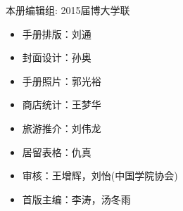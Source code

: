 \begin{titlepage}
\newpage

\topmargin=0cm 

\vspace{3cm}\centerline{\Large 本册编辑组: 2015届博大学联} 

\begin{itemize}
\item[] 手册排版：刘通
\item[] 封面设计：孙奥
\item[] 手册照片：郭光裕
\item[] 商店统计：王梦华
\item[] 旅游推介：刘伟龙
\item[] 居留表格：仇真
\item[] 审核：王增辉，刘怡(中国学院协会)
\item[] 首版主编：李涛，汤冬雨
\end{itemize}


\clearpage{\pagestyle{empty}\cleardoublepage}%
\end{titlepage}


\clearpage{\pagestyle{empty}\cleardoublepage}

{
\hypersetup{linkcolor=black}
\tableofcontents                        %

}
\clearpage{\pagestyle{empty}\cleardoublepage}
